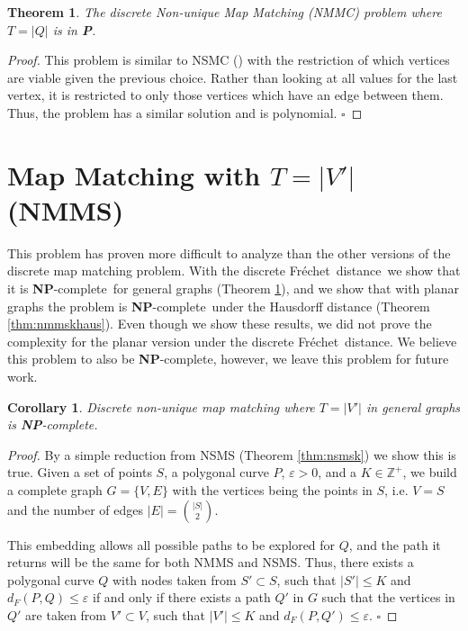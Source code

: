 \documentclass{article}[11pt]
\newcommand{\frechet}{Fr\'echet}
\newcommand{\dfre}{d_F}
\newcommand{\dfd}{discrete \frechet\ distance}
\newcommand{\npc}{\textbf{NP}-complete}
\newtheorem{theorem}{Theorem}
\newtheorem{corollary}{Corollary}
\begin{document}
\begin{theorem}
    The discrete Non-unique Map Matching (NMMC) problem where $T=|Q|$ is in \textbf{P}.
\end{theorem}

\begin{proof}
    This problem is similar to NSMC (\cite{Wylie:2014:TCS}) with the restriction of 
    which vertices are viable given the previous choice.  
    Rather than looking at all values for the last
    vertex, it is restricted to only those vertices which have an edge
    between them.  Thus, the problem has a similar solution and is polynomial.
    \hfill $\square$
\end{proof}





\section{Map Matching with $T=|V'|$ (NMMS)} \label{sec:nmmsk}


This problem has proven more difficult to analyze than the other versions
of the discrete map matching problem.  
With the \dfd\ we show that it is \npc\ for general graphs (Theorem \ref{thm:nmmskgen}), 
and we show that with planar graphs the problem is \npc\ under the
Hausdorff distance (Theorem \ref{thm:nmmskhaus}). Even though we show these results,
we did not prove the complexity for the planar version under the \dfd . 
We believe this problem to also be \npc, however, we leave this problem for future work. 




\begin{corollary} \label{thm:nmmskgen}
    Discrete non-unique map matching where $T=|V'|$ in general graphs is \npc .
\end{corollary}

\begin{proof}
    By a simple reduction from NSMS (Theorem \ref{thm:nsmsk}) we show this is true.
    Given a set of points $S$, a polygonal curve $P$, $\varepsilon > 0$, and a $K \in \mathbb{Z}^+$, 
    we build a complete graph $G=\{V,E\}$ with
    the vertices being the points in $S$, i.e. $V=S$ and the number of edges $|E| = {|S| \choose 2}$. 

    This embedding allows all possible paths to be
    explored for $Q$, and the path it returns will be the same for both NMMS and NSMS.
    Thus, there exists a polygonal curve $Q$ with nodes taken from $S' \subset S$, such that
    $|S'| \leq K$ and $\dfre(P,Q) \leq \varepsilon$ if and only if there exists a path $Q'$
    in $G$ such that the vertices in $Q'$ are taken from $V' \subset V$, such that
    $|V'| \leq K$ and $\dfre(P,Q') \leq \varepsilon$.
\hfill $\square$
\end{proof}
\end{document}
